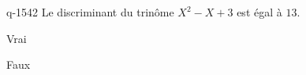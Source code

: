 \begin{truefalse}{q-1542}
Le discriminant du trinôme $X^2-X+3$ est égal à $13$.
\item Vrai
\item* Faux
\end{truefalse}

